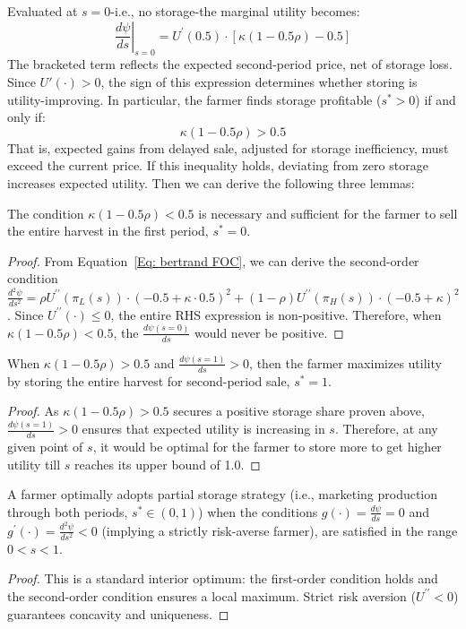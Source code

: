 Evaluated at $s = 0$-i.e., no storage-the marginal utility becomes:
$$
\left.\frac{d\psi}{ds}\right|_{s=0} = U^{\prime}(0.5) \cdot \left[\kappa(1 - 0.5\rho ) - 0.5\right]
$$
The bracketed term reflects the expected second-period price, net of storage loss. Since $U'(\cdot) > 0$, the sign of this expression determines whether storing is utility-improving. In particular, the farmer finds storage profitable ($s^* > 0$) if and only if:
$$
\kappa(1 - 0.5\rho) > 0.5
$$
That is, expected gains from delayed sale, adjusted for storage inefficiency, must exceed the current price. If this inequality holds, deviating from zero storage increases expected utility. Then we can derive the following three lemmas:
\begin{lemma}
    The condition $\kappa (1 - 0.5\rho) < 0.5$ is necessary and sufficient for the farmer to sell the entire harvest in the first period, $s^*=0$.
        \label{lemma: Bertrand no storage solution}
\end{lemma}
\begin{proof}
    From Equation~\ref{Eq: bertrand FOC}, we can derive the second-order condition $\frac{d^2 \psi}{d s^2} = \rho U^{\prime \prime}\left(\pi_L(s)\right) \cdot\left(-0.5+ \kappa \cdot 0.5\right)^2+(1-\rho) U^{\prime \prime}\left(\pi_H(s)\right) \cdot\left(-0.5+\kappa\right)^2$. Since $U^{\prime\prime}(\cdot)\leq0$, the entire RHS expression is non-positive. Therefore, when $\kappa (1-0.5\rho) < 0.5 $, the $\frac{d \psi(s=0)}{d s}$ would never be positive.
\end{proof}


\begin{lemma}
     When $\kappa (1-0.5\rho) > 0.5 $ and $\frac{d \psi(s=1)}{d s}>0$, then the farmer maximizes utility by storing the entire harvest for second-period sale, $s^*=1$.
    \label{lemma: Bertrand full storage solution}
\end{lemma}
\begin{proof}
    As $\kappa (1-0.5\rho) > 0.5 $ secures a positive storage share proven above, $\frac{d \psi(s=1)}{d s}>0$ ensures that expected utility is increasing in $s$. Therefore, at any given point of $s$, it would be optimal for the farmer to store more to get higher utility till $s$ reaches its upper bound of 1.0.
\end{proof}


\begin{lemma}
    A farmer optimally adopts partial storage strategy (i.e., marketing production through both periods, $s^*\in (0,1)$) when the conditions $g(\cdot)  =  \frac{d \psi}{d s} = 0$ and $g^\prime(\cdot) = \frac{d^2 \psi}{d s^2} < 0 $ (implying a strictly risk-averse farmer), are satisfied in the range $0<s<1$.
    \label{lemma: Bertrand Interior solution}
\end{lemma}
\begin{proof}
    This is a standard interior optimum: the first-order condition holds and the second-order condition ensures a local maximum. Strict risk aversion ($U^{\prime\prime} < 0$) guarantees concavity and uniqueness.
\end{proof}

